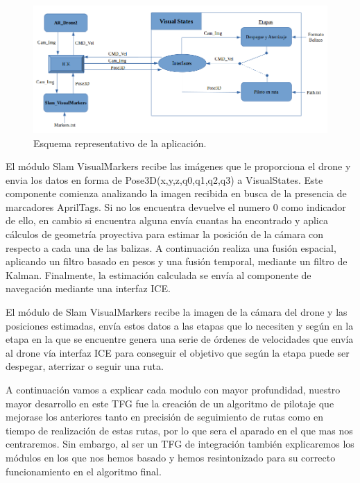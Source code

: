 \begin{figure}[H]
	\begin{center}
		\includegraphics[width=1.1\textwidth]{imag/IMG30.png}
				\caption{Esquema representativo de la aplicación.}
		\label{fig:Esquema representativo.}	
	\end{center}
\end{figure}

\hspace{1cm} El módulo Slam VisualMarkers recibe las imágenes que le proporciona el drone y envia los datos en forma de Pose3D(x,y,z,q0,q1,q2,q3) a VisualStates. Este componente comienza analizando la imagen recibida en busca de la presencia de marcadores AprilTags. Si no los encuentra devuelve el numero 0 como indicador de ello, en cambio si encuentra alguna envía cuantas ha encontrado y aplica cálculos de geometría proyectiva para estimar la posición de la cámara con respecto a cada una de las balizas. A continuación realiza una fusión espacial, aplicando un filtro basado en pesos y una fusión temporal, mediante un filtro de Kalman. Finalmente, la estimación calculada se envía al componente de navegación mediante una interfaz ICE.

\hspace{1cm} El módulo de Slam VisualMarkers recibe la imagen de la cámara del drone y las posiciones estimadas, envía estos datos a las etapas que lo necesiten y según en la etapa en la que se encuentre genera una serie de órdenes de velocidades que envía al drone vía interfaz ICE para conseguir el objetivo que según la etapa puede ser despegar, aterrizar o seguir una ruta.

\hspace{1cm} A continuación vamos a explicar cada modulo con mayor profundidad, nuestro mayor desarrollo en este TFG fue la creación de un algoritmo de pilotaje que mejorase los anteriores tanto en precisión de seguimiento de rutas como en tiempo de realización de estas rutas, por lo que sera el aparado en el que mas nos centraremos. Sin embargo, al ser un TFG de integración también explicaremos los módulos en los que nos hemos basado y hemos resintonizado para su correcto funcionamiento en el algoritmo final. 

